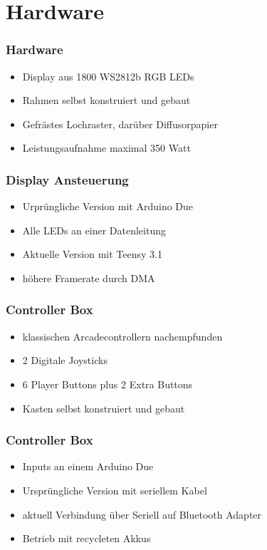 \documentclass[aspectratio=1610,svgnames]{beamer}
\newcommand{\divider}[1]{\begin{frame} %
\begin{alertblock}{} %
\centering\usebeamerfont{section title}#1 %
\end{alertblock} %
\end{frame}}
\begin{document}
\section{Hardware}
\divider{\insertsection}
\begin{frame}[<+->]
    \frametitle{Hardware}
    \begin{itemize}
        \item Display aus 1800 WS2812b RGB LEDs
        \item Rahmen selbst konstruiert und gebaut
        \item Gefrästes Lochraster, darüber Diffusorpapier
        \item Leistungsaufnahme maximal 350 Watt
    \end{itemize}
\end{frame} 
\begin{frame}[<+->]
    \frametitle{Display Ansteuerung}
    \begin{itemize}
        \item Urprüngliche Version mit Arduino Due
        \item Alle LEDs an einer Datenleitung
        \item Aktuelle Version mit Teensy 3.1
        \item höhere Framerate durch DMA
    \end{itemize}
\end{frame} 
\begin{frame}[<+->]
    \frametitle{Controller Box}
    \begin{itemize}
        \item klassischen Arcadecontrollern nachempfunden
        \item 2 Digitale Joysticks
        \item 6 Player Buttons plus 2 Extra Buttons
        \item Kasten selbst konstruiert und gebaut
    \end{itemize}
\end{frame} 
\begin{frame}[<+->]
    \frametitle{Controller Box}
    \begin{itemize}
        \item Inputs an einem Arduino Due
        \item Ursprüngliche Version mit seriellem Kabel
        \item aktuell Verbindung über Seriell auf Bluetooth Adapter
        \item Betrieb mit recycleten Akkus
    \end{itemize}
\end{frame} 
\end{document}
